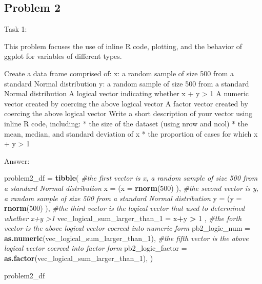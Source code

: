 \documentclass[]{article}
\newenvironment{Shaded}{\begin{snugshade}}{\end{snugshade}}
\newcommand{\CommentTok}[1]{\textcolor[rgb]{0.56,0.35,0.01}{\textit{#1}}}
\newcommand{\DataTypeTok}[1]{\textcolor[rgb]{0.13,0.29,0.53}{#1}}
\newcommand{\DecValTok}[1]{\textcolor[rgb]{0.00,0.00,0.81}{#1}}
\newcommand{\KeywordTok}[1]{\textcolor[rgb]{0.13,0.29,0.53}{\textbf{#1}}}
\newcommand{\NormalTok}[1]{#1}
\newcommand{\OperatorTok}[1]{\textcolor[rgb]{0.81,0.36,0.00}{\textbf{#1}}}
\newcommand{\StringTok}[1]{\textcolor[rgb]{0.31,0.60,0.02}{#1}}
\begin{document}
\hypertarget{problem-2}{%
\subsection{Problem 2}\label{problem-2}}

Task 1:

This problem focuses the use of inline R code, plotting, and the
behavior of ggplot for variables of different types.

Create a data frame comprised of: x: a random sample of size 500 from a
standard Normal distribution y: a random sample of size 500 from a
standard Normal distribution A logical vector indicating whether x + y
\textgreater{} 1 A numeric vector created by coercing the above logical
vector A factor vector created by coercing the above logical vector
Write a short description of your vector using inline R code, including:
* the size of the dataset (using nrow and ncol) * the mean, median, and
standard deviation of x * the proportion of cases for which x + y
\textgreater{} 1

Answer:

\begin{Shaded}
\begin{Highlighting}[]
\NormalTok{problem2_df =}\StringTok{ }\KeywordTok{tibble}\NormalTok{(}
  \CommentTok{#the first vector is x, a random sample of size 500 from a standard Normal distribution}
  \DataTypeTok{x =}\NormalTok{ (}\DataTypeTok{x =} \KeywordTok{rnorm}\NormalTok{(}\DecValTok{500}\NormalTok{) ),}
 \CommentTok{#the second vector is y, a random sample of size 500 from a standard Normal distribution}
  \DataTypeTok{y =}\NormalTok{ (}\DataTypeTok{y =} \KeywordTok{rnorm}\NormalTok{(}\DecValTok{500}\NormalTok{) ),}
  \CommentTok{#the third vector is the logical vector that used to determined whether x+y >1}
  \DataTypeTok{vec_logical_sum_larger_than_1 =}\NormalTok{ x}\OperatorTok{+}\NormalTok{y }\OperatorTok{>}\StringTok{ }\DecValTok{1}\NormalTok{ ,}
  \CommentTok{#the forth vector is the above logical vector coerced into numeric form}
   \DataTypeTok{pb2_logic_num =} \KeywordTok{as.numeric}\NormalTok{(vec_logical_sum_larger_than_}\DecValTok{1}\NormalTok{),}
 \CommentTok{#the fifth vector is the above logical vector coerced into factor form}
   \DataTypeTok{pb2_logic_factor =} \KeywordTok{as.factor}\NormalTok{(vec_logical_sum_larger_than_}\DecValTok{1}\NormalTok{),}
\NormalTok{ )}

\NormalTok{problem2_df}
\end{Highlighting}
\end{Shaded}
\end{document}
